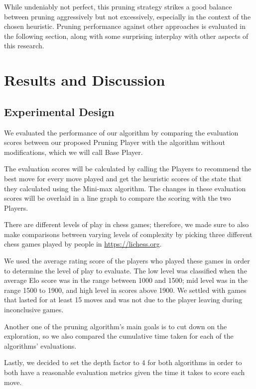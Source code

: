 \documentclass[letterpaper]{article}
\begin{document}
While undeniably not perfect, this pruning strategy strikes a good balance between pruning aggressively but not excessively, especially in the context of the chosen heuristic.  Pruning performance against other approaches is evaluated in the following section, along with some surprising interplay with other aspects of this research.

\section{Results and Discussion}
\subsection{Experimental Design}
We evaluated the performance of our algorithm by comparing the evaluation scores between our proposed Pruning Player with the algorithm without modifications, which we will call Base Player.

The evaluation scores will be calculated by calling the Players to recommend the best move for every move played and get the heuristic scores of the state that they calculated using the Mini-max algorithm. The changes in these evaluation scores will be overlaid in a line graph to compare the scoring with the two Players.

There are different levels of play in chess games; therefore, we made sure to also make comparisons between varying levels of complexity by picking three different chess games played by people in \url{https://lichess.org}. 

We used the average rating score of the players who played these games in order to determine the level of play to evaluate. The low level was classified when the average Elo score was in the range between 1000 and 1500; mid level was in the range 1500 to 1900, and high level in scores above 1900. We settled with games that lasted for at least 15 moves and was not due to the player leaving during inconclusive games.

Another one of the pruning algorithm’s main goals is to cut down on the exploration, so we also compared the cumulative time taken for each of the algorithms' evaluations.

Lastly, we decided to set the depth factor to 4 for both algorithms in order to both have a reasonable evaluation metrics given the time it takes to score each move.
\end{document}
